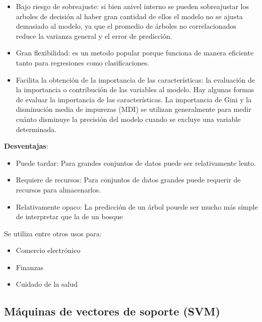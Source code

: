 \begin{itemize}
	\item{Bajo riesgo de sobreajuste}: si bien anivel interno se pueden sobreajustar los arboles de decisión al haber gran cantidad de ellos el modelo no se ajusta demasiado al modelo, ya que el promedio de árboles no correlacionados reduce la varianza general y el error de predicción.
	
	\item{Gran flexibilidad}: es un metodo popular porque funciona de manera eficiente tanto para regresiones como clasificaciones.
	
	\item{Facilita la obtención de la importancia de las características}: la evaluación de la importancia o contribución de las variables al modelo. Hay algunas formas de evaluar la importancia de las características. La importancia de Gini y la disminución media de impurezas (MDI) se utilizan generalmente para medir cuánto disminuye la precisión del modelo cuando se excluye una variable determinada.
	
\end{itemize}

\textbf{Desventajas}:

\begin{itemize}
	\item{Puede tardar}: Para grandes conjuntos de datos puede ser relativamente lento.
	
	\item{Requiere de recursos}: Para conjuntos de datos grandes puede requerir de recursos para almacenarlos.
	
	\item{Relativamente opaco}: La predicción de un árbol pouede ser mucho más simple de interpretar que la de un bosque
	
\end{itemize}

Se utiliza entre otros usos para:

\begin{itemize}
	\item{Comercio electrónico}
	
	\item{Finanzas}
	
	\item{Cuidado de la salud}
	
\end{itemize}

\subsection{Máquinas de vectores de soporte (SVM)}

